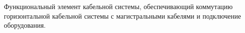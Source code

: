 Функциональный элемент кабельной системы, 
обеспечивающий коммутацию горизонтальной кабельной
системы с магистральными кабелями и подключение оборудования.